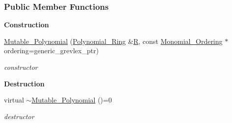 \subsubsection*{Public Member Functions}
\begin{Indent}\textbf{ Construction}\par
\begin{DoxyCompactItemize}
\item 
\mbox{\label{group__polygroup_ad517faca8bbd385411603bbb20f29735}} 
\hyperlink{group__polygroup_ad517faca8bbd385411603bbb20f29735}{Mutable\+\_\+\+Polynomial} (\hyperlink{group__polygroup_class_polynomial___ring}{Polynomial\+\_\+\+Ring} \&\hyperlink{group__polygroup_a551ade20b7dcd96c227dd0401f6ffbbe}{R}, const \hyperlink{group__orderinggroup_class_monomial___ordering}{Monomial\+\_\+\+Ordering} $\ast$ordering=generic\+\_\+grevlex\+\_\+ptr)
\begin{DoxyCompactList}\small\item\em constructor \end{DoxyCompactList}\end{DoxyCompactItemize}
\end{Indent}
\begin{Indent}\textbf{ Destruction}\par
\begin{DoxyCompactItemize}
\item 
\mbox{\label{group__polygroup_ad81cb5bb2a87a289c73fb6cd39afa029}} 
virtual \hyperlink{group__polygroup_ad81cb5bb2a87a289c73fb6cd39afa029}{$\sim$\+Mutable\+\_\+\+Polynomial} ()=0
\begin{DoxyCompactList}\small\item\em destructor \end{DoxyCompactList}\end{DoxyCompactItemize}
\end{Indent}
